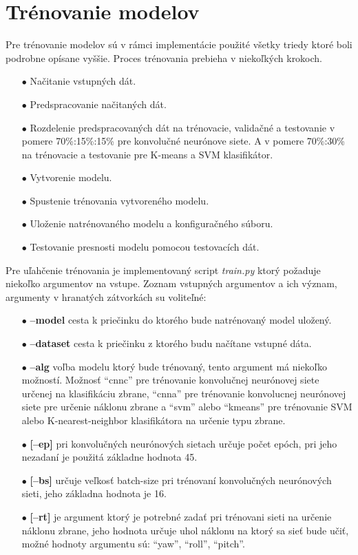 
\section{Trénovanie modelov}
\label{sec:trenovanie}
Pre trénovanie modelov sú v rámci implementácie použité všetky triedy ktoré boli podrobne opísane vyššie.
Proces trénovania prebieha v niekoľkých krokoch.
\begin{enumerate}
    \item[$\bullet$] Načitanie vstupných dát.
    \item[$\bullet$] Predspracovanie načitaných dát.
    \item[$\bullet$] Rozdelenie predspracovaných dát na trénovacie, validačné a testovanie v pomere 70\%:15\%:15\% pre konvolučné neurónove siete.
    A v pomere 70\%:30\% na trénovacie a testovanie pre K-means a SVM klasifikátor.
    \item[$\bullet$] Vytvorenie modelu.
    \item[$\bullet$] Spustenie trénovania vytvoreného modelu.
    \item[$\bullet$] Uloženie natrénovaného modelu a konfiguračného súboru.
    \item[$\bullet$] Testovanie presnosti modelu pomocou testovacích dát.
\end{enumerate}

Pre uľahčenie trénovania je implementovaný script \textit{train.py} ktorý požaduje niekoľko argumentov na vstupe.
Zoznam vstupných argumentov a ich význam, argumenty v hranatých zátvorkách su voliteľné:
\begin{enumerate}
  \item[$\bullet$] \textbf{--model} cesta k priečinku do ktorého bude natrénovaný model uložený.
  \item[$\bullet$] \textbf{--dataset} cesta k priečinku z ktorého budu načítane vstupné dáta.
  \item[$\bullet$] \textbf{--alg} voľba modelu ktorý bude trénovaný, tento argument má niekoľko možností.
  Možnosť ``cnnc'' pre trénovanie konvolučnej neurónovej siete určenej na klasifikáciu zbrane,
  ``cnna'' pre trénovanie konvolucnej neurónovej siete pre určenie náklonu zbrane a
  ``svm'' alebo ``kmeans'' pre trénovanie SVM alebo K-nearest-neighbor klasifikátora na určenie typu zbrane.
  \item[$\bullet$] \textbf{[--ep]} pri konvolučných neurónových sietach určuje počet epóch, pri jeho nezadaní je použitá
  základne hodnota 45.
  \item[$\bullet$] \textbf{[--bs]} určuje veľkosť batch-size pri trénovaní konvolučných neurónových sieti, jeho
  základna hodnota je 16.
  \item[$\bullet$] \textbf{[--rt]} je argument ktorý je potrebné zadať pri trénovani sieti na určenie náklonu zbrane,
  jeho hodnota určuje uhol náklonu na ktorý sa sieť bude učiť, možné hodnoty argumentu sú: ``yaw'', ``roll'', ``pitch''.
\end{enumerate}

